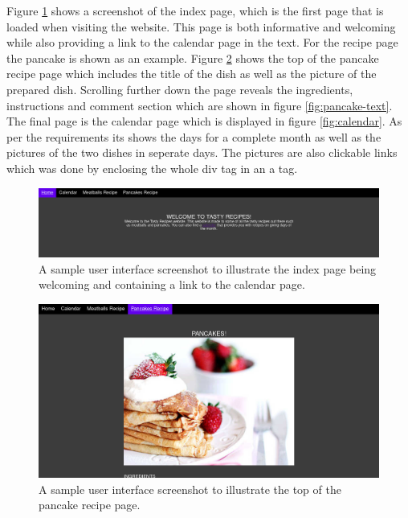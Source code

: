 \documentclass[a4paper]{scrartcl}
\begin{document}
Figure \ref{fig:index} shows a screenshot of the index page, which is the first page that is loaded when visiting the website. This page is both informative and welcoming while also providing a link to the calendar page in the text. For the recipe page the pancake is shown as an example. Figure \ref{fig:pancakes-picture} shows the top of the pancake recipe page which includes the title of the dish as well as the picture of the prepared dish. Scrolling further down the page reveals the ingredients, instructions and comment section which are shown in figure \ref{fig:pancake-text}. The final page is the calendar page which is displayed in figure \ref{fig:calendar}. As per the requirements its shows the days for a complete month as well as the pictures of the two dishes in seperate days. The pictures are also clickable links which was done by enclosing the whole div tag in an a tag.

\begin{figure}[h!]
    \begin{center}
        \includegraphics[scale=0.2]{images/index.png}
        \caption{A sample user interface screenshot to illustrate the index page being welcoming and containing a link to the calendar page.}
        \label{fig:index}
    \end{center}
\end{figure}

\begin{figure}[h!]
    \begin{center}
        \includegraphics[scale=0.2]{images/pancakes-picture.png}
        \caption{A sample user interface screenshot to illustrate the top of the pancake recipe page.}
        \label{fig:pancakes-picture}
    \end{center}
\end{figure}
\end{document}
